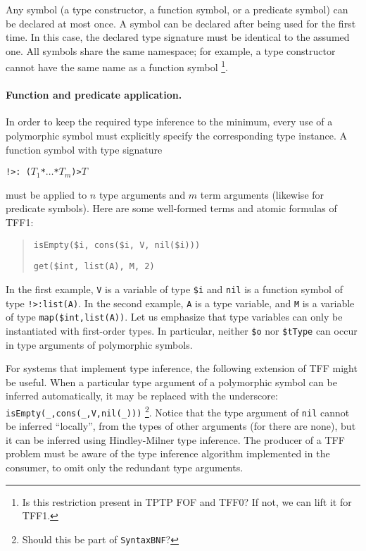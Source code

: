 Any symbol (a type constructor, a function symbol, or a predicate symbol)
can be declared at most once. A symbol can be declared after being used
for the first time. In this case, the declared type signature must be
identical to the assumed one. All symbols share the same namespace; for
example, a type constructor cannot have the same name as a function symbol%
\footnote{Is this restriction present in TPTP FOF and TFF0? If not, we can
lift it for TFF1.}.

\paragraph{Function and predicate application.} In order to keep
the required type inference to the minimum, every use of a polymorphic
symbol must explicitly specify the corresponding type instance.
A function symbol with type signature
\begin{center}
{\tt !>\;:\;%
($T_1$\;*\;$\dots$\;*\;$T_m$)\;>\;$T$}
\end{center}
must be applied to $n$ type arguments and $m$ term arguments
(likewise for predicate symbols). Here are some well-formed
terms and atomic formulas of TFF1:
\begin{quote}
\verb+isEmpty($i, cons($i, V, nil($i)))+
\par\medskip
\verb+get($int, list(A), M, 2)+
\end{quote}
In the first example, {\tt V} is a variable of type {\tt \$i}
and {\tt nil} is a function
symbol of type {\tt !>\;[A:\$tType]\;:\;list(A)}. In the second
example, {\tt A} is a type variable, and {\tt M} is a variable
of type {\tt map(\$int,list(A))}. Let us emphasize that type
variables can only be instantiated with first-order types.
In particular, neither \verb+$o+ nor \verb+$tType+ can occur
in type arguments of polymorphic symbols.

For systems that implement type inference, the following extension
of TFF might be useful. When a particular type argument of
a polymorphic symbol can be inferred automatically, it may be
replaced with the underscore: \verb+isEmpty(_,cons(_,V,nil(_)))+%
\footnote{Should this be part of {\tt SyntaxBNF}?}.
Notice that the type argument of {\tt nil} cannot be inferred
``locally'', from the types of other arguments (for there are none),
but it can be inferred using Hindley-Milner type inference.
The producer of a TFF problem must be aware of the type
inference algorithm implemented in the consumer, to omit
only the redundant type arguments.

